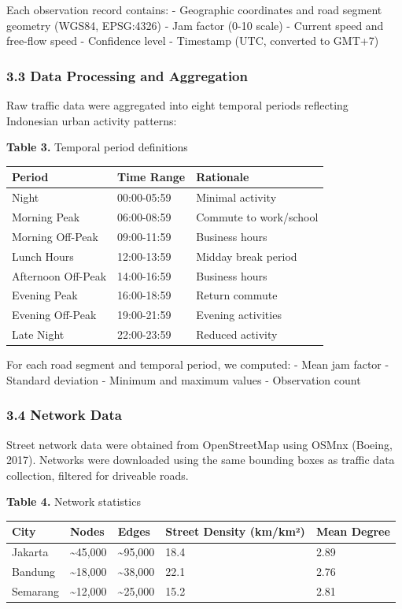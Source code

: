 Each observation record contains: - Geographic coordinates and road segment geometry (WGS84, EPSG:4326) - Jam factor (0-10 scale) - Current speed and free-flow speed - Confidence level - Timestamp (UTC, converted to GMT+7)

\subsubsection{3.3 Data Processing and Aggregation}\label{data-processing-and-aggregation}

Raw traffic data were aggregated into eight temporal periods reflecting Indonesian urban activity patterns:

\textbf{Table 3.} Temporal period definitions

\begin{longtable}[]{@{}lll@{}}
\toprule\noalign{}
Period & Time Range & Rationale \\
\midrule\noalign{}
\endhead
\bottomrule\noalign{}
\endlastfoot
Night & 00:00-05:59 & Minimal activity \\
Morning Peak & 06:00-08:59 & Commute to work/school \\
Morning Off-Peak & 09:00-11:59 & Business hours \\
Lunch Hours & 12:00-13:59 & Midday break period \\
Afternoon Off-Peak & 14:00-16:59 & Business hours \\
Evening Peak & 16:00-18:59 & Return commute \\
Evening Off-Peak & 19:00-21:59 & Evening activities \\
Late Night & 22:00-23:59 & Reduced activity \\
\end{longtable}

For each road segment and temporal period, we computed: - Mean jam factor - Standard deviation - Minimum and maximum values - Observation count

\subsubsection{3.4 Network Data}\label{network-data}

Street network data were obtained from OpenStreetMap using OSMnx (Boeing, 2017). Networks were downloaded using the same bounding boxes as traffic data collection, filtered for driveable roads.

\textbf{Table 4.} Network statistics

\begin{longtable}[]{@{}lllll@{}}
\toprule\noalign{}
City & Nodes & Edges & Street Density (km/km²) & Mean Degree \\
\midrule\noalign{}
\endhead
\bottomrule\noalign{}
\endlastfoot
Jakarta & \textasciitilde45,000 & \textasciitilde95,000 & 18.4 & 2.89 \\
Bandung & \textasciitilde18,000 & \textasciitilde38,000 & 22.1 & 2.76 \\
Semarang & \textasciitilde12,000 & \textasciitilde25,000 & 15.2 & 2.81 \\
\end{longtable}

